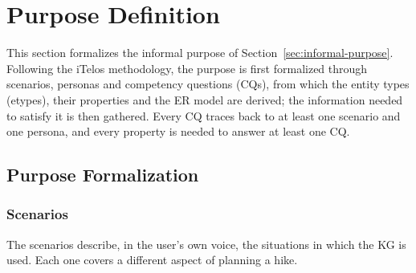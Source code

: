 \section{Purpose Definition}

\newcommand{\persona}[7]{%
\noindent\begin{minipage}[t]{0.66\linewidth}
\textbf{#1 -- #2}\\[2pt]
\textbf{Differentiator.} #3\\[2pt]
\textbf{Technological resources.} #4\\[2pt]
\textbf{Needs.} #5\\[2pt]
\textbf{Purposes.} #6
\end{minipage}\hfill
\begin{minipage}[t]{0.3\linewidth}
\small
\renewcommand{\arraystretch}{1.15}
\begin{tabular}[t]{|l|l|}
\hline
\multicolumn{2}{|c|}{\textbf{Personal information}} \\ \hline
#7
\hline
\end{tabular}
\end{minipage}
\vspace{10pt}

}

This section formalizes the informal purpose of Section~\ref{sec:informal-purpose}. Following the iTelos methodology, the purpose is first formalized through scenarios, personas and competency questions (CQs), from which the entity types (etypes), their properties and the ER model are derived; the information needed to satisfy it is then gathered. Every CQ traces back to at least one scenario and one persona, and every property is needed to answer at least one CQ.

\subsection{Purpose Formalization}

\subsubsection{Scenarios}
\label{sec:scenarios}
The scenarios describe, in the user's own voice, the situations in which the KG is used. Each one covers a different aspect of planning a hike.

